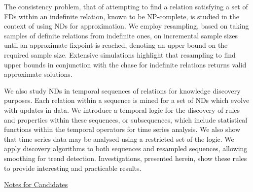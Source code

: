 \documentclass[12pt]{article}
\begin{document}
\medskip

The consistency
problem, that of attempting to find a relation satisfying a set of FDs
within an indefinite relation, known to be
NP-complete, is studied in the context of using NDs for approximation.
We employ resampling, based on taking samples of definite
relations from indefinite ones, on incremental
sample sizes until an approximate fixpoint is
reached, denoting an upper bound on the required sample
size. Extensive simulations highlight that resampling
to find upper bounds in conjunction with the chase for
indefinite relations returns valid approximate solutions.

\medskip

We also study NDs in temporal sequences of relations for knowledge
discovery purposes. Each relation within a sequence is mined for a set of NDs
which evolve with updates in data. We introduce a temporal logic for the
discovery of rules and properties within these sequences, or
subsequences, which
include statistical functions within the temporal operators for
time series analysis. We also show that time series data may be analysed
using a restricted set of the logic.
We apply discovery algorithms to both
sequences and resampled sequences, allowing smoothing for trend
detection. Investigations, presented herein, show these rules to
provide interesting and practicable results.

\newpage

\underline{Notes for Candidates} \newline
\end{document}
